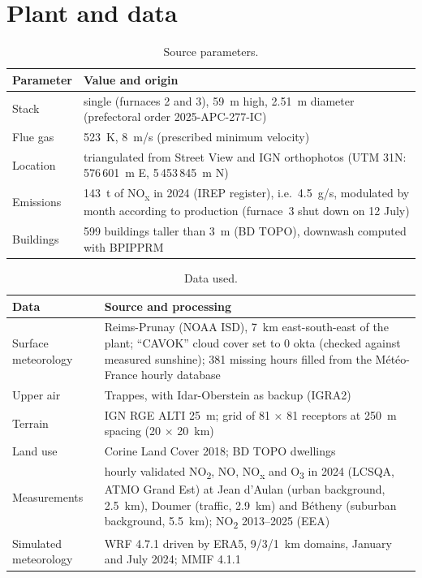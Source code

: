 \documentclass[11pt,a4paper]{article}
\newcommand{\NOx}{NO\textsubscript{x}}
\newcommand{\NOd}{NO\textsubscript{2}}
\begin{document}
\section{Plant and data}
\begin{table}[htbp]
\centering\small
\caption{Source parameters.}
\begin{tabularx}{\textwidth}{lY}
\toprule
Parameter & Value and origin \\
\midrule
Stack & single (furnaces 2 and 3), 59~m high, 2.51~m diameter (prefectoral order 2025-APC-277-IC) \\
Flue gas & 523~K, 8~m/s (prescribed minimum velocity) \\
Location & triangulated from Street View and IGN orthophotos (UTM 31N: 576\,601~m E, 5\,453\,845~m N) \\
Emissions & 143~t of \NOx{} in 2024 (IREP register), i.e.\ 4.5~g/s, modulated by month according to production (furnace~3 shut down on 12 July) \\
Buildings & 599 buildings taller than 3~m (BD TOPO), downwash computed with BPIPPRM \\
\bottomrule
\end{tabularx}
\end{table}

\begin{table}[htbp]
\centering\small
\caption{Data used.}
\begin{tabularx}{\textwidth}{lY}
\toprule
Data & Source and processing \\
\midrule
Surface meteorology & Reims-Prunay (NOAA ISD), 7~km east-south-east of the plant; ``CAVOK'' cloud cover set to 0 okta (checked against measured sunshine); 381 missing hours filled from the Météo-France hourly database \\
Upper air & Trappes, with Idar-Oberstein as backup (IGRA2) \\
Terrain & IGN RGE ALTI 25~m; grid of 81 × 81 receptors at 250~m spacing (20 × 20~km) \\
Land use & Corine Land Cover 2018; BD TOPO dwellings \\
Measurements & hourly validated \NOd, NO, \NOx{} and O\textsubscript{3} in 2024 (LCSQA, ATMO Grand Est) at Jean d'Aulan (urban background, 2.5~km), Doumer (traffic, 2.9~km) and Bétheny (suburban background, 5.5~km); \NOd{} 2013–2025 (EEA) \\
Simulated meteorology & WRF 4.7.1 driven by ERA5, 9/3/1~km domains, January and July 2024; MMIF 4.1.1 \\
\bottomrule
\end{tabularx}
\end{table}
\end{document}

